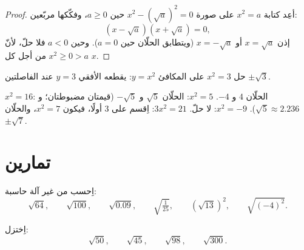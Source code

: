 \begin{proof}
أعِد كتابة $x^2 = a$ على صورة $x^2 - \left(\sqrt a\right)^2 = 0$ حين
$a \geq 0$، وفكّكها  مربّعين:
\[
\left(x - \sqrt a\right)\left(x + \sqrt a\right) = 0 ,
\]
إذن $x = \sqrt a$ أو $x = -\sqrt a$ (ويتطابق الحلّان حين $a = 0$).
وحين $a < 0$ فلا حلّ، لأنّ $x^2 \geq 0 > a$ من أجل كل $x$.
\end{proof}

\begin{omfigure}

{\small حل $x^2 = 3$ على  المكافئ $y = x^2$: يقطعه 
الأفقي $y = 3$ عند الفاصلتين $\pm\sqrt3$.}
\end{omfigure}

\begin{example}
$x^2 = 16$: الحلّان $4$ و $-4$. \quad
$x^2 = 5$: الحلّان $\sqrt5$ و $-\sqrt5$ (قيمتان مضبوطتان؛ و $\sqrt5
\approx 2.236$). \quad
$x^2 = -9$: لا حلّ. \quad
$3x^2 = 21$: اِقسم على 3 أولًا، فيكون $x^2 = 7$، والحلّان $\pm\sqrt7$.
\end{example}

\section{تمارين}

\begin{exercise}[$\star$]\label{exo:g9:sqrt:1}
اِحسب من غير آلة حاسبة:
\[
\sqrt{64}, \qquad \sqrt{100}, \qquad \sqrt{0.09}, \qquad
\sqrt{\tfrac{1}{25}}, \qquad \left(\sqrt{13}\right)^2, \qquad
\sqrt{(-4)^2} .
\]
\end{exercise}

\begin{exercise}[$\star$]\label{exo:g9:sqrt:2}
اِختزل:
\[
\sqrt{50}, \qquad \sqrt{45}, \qquad \sqrt{98}, \qquad \sqrt{300} .
\]
\end{exercise}

